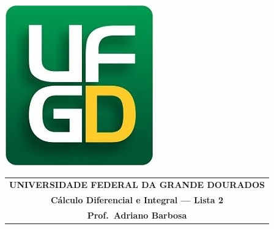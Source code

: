 \documentclass[a4paper,5pt]{amsbook}
\begin{document}
\thispagestyle{empty}
\pagestyle{empty}
\begin{minipage}[h]{0.14\textwidth}
	\includegraphics[scale=0.24]{../ufgd.png}
\end{minipage}
\begin{minipage}[h]{\textwidth}
\begin{tabular}{c}
{{\bf UNIVERSIDADE FEDERAL DA GRANDE DOURADOS}}\\
{{\bf C\'alculo Diferencial e Integral --- Lista 2}}\\
{{\bf Prof.\ Adriano Barbosa}}\\
\end{tabular}
\vspace{-0.45cm}
%
\end{minipage}

\end{document}
